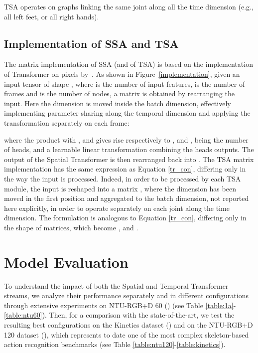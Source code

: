 \documentclass[times,twocolumn,final,authoryear]{elsarticle}
\begin{document}
TSA operates on graphs linking the same joint along all the time dimension (e.g., all left feet, or all right hands).
















\subsection{Implementation of SSA and TSA} \label{sec:implementation}

The matrix implementation of SSA (and of TSA) is based on the implementation of Transformer on pixels by~\cite{DBLP:journals/corr/abs-1904-09925}. As shown in Figure~\ref{implementation}, given an input tensor of shape , where  is the number of input features,  is the number of frames and  is the number of nodes, a matrix  is obtained by rearranging the input. Here the  dimension is moved inside the batch dimension, effectively implementing parameter sharing along the temporal dimension and applying the transformation separately on each frame:

where the product with ,  and  gives rise respectively to ,  and , being  the number of heads, and  a learnable linear transformation combining the heads outputs. 
The output of the Spatial Transformer is then rearranged back into . The TSA matrix implementation has the same expression as Equation \eqref{tr_con}, differing only in the way the input  is processed. Indeed, in order to be processed by each TSA module, the input is reshaped into a matrix , where the  dimension has been moved in the first position and aggregated to the batch dimension, not reported here explicitly, in order to operate separately on each joint along the time dimension. 
The formulation is analogous to Equation \eqref{tr_con}, differing only in the shape of matrices, which become ,  and .



\section{Model Evaluation}
To understand the impact of both the Spatial and Temporal Transformer streams, we analyze their performance separately and in different configurations through extensive experiments on NTU-RGB+D 60 (\cite{ntu}) (see Table \ref{table:1a}-\ref{table:ntu60}). Then, for a comparison with the state-of-the-art, we test the resulting best configurations on the Kinetics dataset (\cite{Kin}) and on the NTU-RGB+D 120 dataset (\cite{ntu120}), which represents to date one of the most complex skeleton-based action recognition benchmarks (see Table \ref{table:ntu120}-\ref{table:kinetics}).
\end{document}
